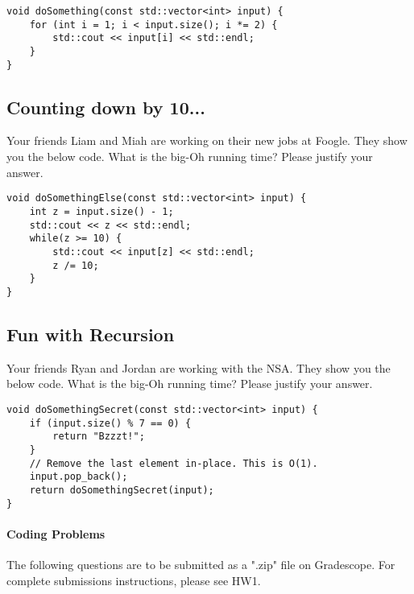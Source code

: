 \documentclass [12pt]{article}
\begin{document}
\vspace{2em}
\begin{verbatim}
void doSomething(const std::vector<int> input) {
    for (int i = 1; i < input.size(); i *= 2) {
        std::cout << input[i] << std::endl;
    }
}
\end{verbatim}


\subsection{Counting down by 10...}
 Your friends Liam and Miah are working on their new jobs at Foogle. They show you the below code. What is the big-Oh running time? Please justify your answer.

\vspace{2em}
\begin{verbatim}
void doSomethingElse(const std::vector<int> input) {
    int z = input.size() - 1;
    std::cout << z << std::endl;
    while(z >= 10) {
        std::cout << input[z] << std::endl;
        z /= 10;
    }
}
\end{verbatim}


\pagebreak
\subsection{Fun with Recursion}
 Your friends Ryan and Jordan are working with the NSA. They show you the below code. What is the big-Oh running time? Please justify your answer.

\vspace{2em}
\begin{verbatim}
void doSomethingSecret(const std::vector<int> input) {
    if (input.size() % 7 == 0) {
        return "Bzzzt!";
    }
    // Remove the last element in-place. This is O(1).
    input.pop_back();
    return doSomethingSecret(input);
}
\end{verbatim}


\pagebreak
\begin{Instruction}

\paragraph{Coding Problems} The following questions are to be submitted as a ".zip" file on Gradescope. For complete submissions instructions, please see HW1.

\end{Instruction}
\end{document}
